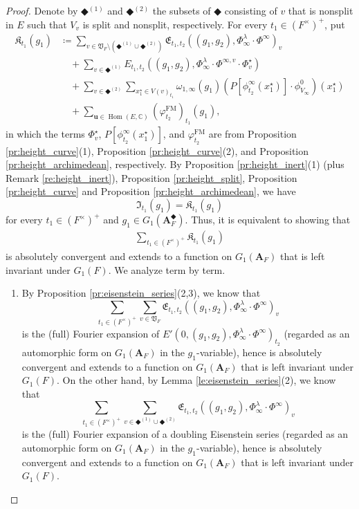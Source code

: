 \documentclass[12pt]{amsart}
\numberwithin{equation}{section}
\theoremstyle{plain}
\theoremstyle{definition}
\theoremstyle{remark}
\renewcommand{\b}[1]{\mathbf{#1}}
\renewcommand{\d}[1]{\mathbb{#1}}
\newcommand{\f}[1]{\mathfrak{#1}}
\renewcommand{\r}[1]{\mathrm{#1}}
\renewcommand{\(}{\left(}
\renewcommand{\)}{\right)}
\newcommand{\bA}{\b A}
\newcommand{\dC}{\d C}
\newcommand{\fE}{\f E}
\newcommand{\fI}{\f I}
\newcommand{\fK}{\f K}
\newcommand{\fV}{\f V}
\newcommand{\bbu}{\boldsymbol{u}}
\newcommand{\KM}{\r{FM}}
\DeclareMathOperator{\Hom}{Hom}
\begin{document}
\begin{proof}
Denote by $\Diamondblack^{(1)}$ and $\Diamondblack^{(2)}$ the subsets of $\Diamondblack$ consisting of $v$ that is nonsplit in $E$ such that $V_v$ is split and nonsplit, respectively. For every $t_1\in(F^\times)^+$, put
\begin{align*}
\fK_{t_1}(g_1)&\coloneqq \sum_{v\in\fV_F\setminus(\Diamondblack^{(1)}\cup\Diamondblack^{(2)})}
\fE_{t_1,t_2}((g_1,g_2),\Phi^\lambda_\infty\cdot\Phi^\infty)_v \\
&\quad +\sum_{v\in\Diamondblack^{(1)}}E_{t_1,t_2}((g_1,g_2),\Phi^\lambda_\infty\cdot\Phi^{\infty,v}\cdot\Phi^\star_v) \\
&\quad +\sum_{v\in\Diamondblack^{(2)}}\sum_{x^\star_1\in V(v)_{t_1}}\omega_{1,\infty}(g_1)\(P[\phi^\infty_{t_2}(x^\star_1)]\cdot\phi^0_{V_\infty}\)(x^\star_1) \\
&\quad +\sum_{\bbu\in\Hom(E,\dC)}(\varphi^\KM_{t_2})_{t_1}(g_1),
\end{align*}
in which the terms $\Phi^\star_{v}$, $P[\phi^\infty_{t_2}(x^\star_1)]$, and $\varphi^\KM_{t_2}$ are from Proposition \ref{pr:height_curve}(1), Proposition \ref{pr:height_curve}(2), and Proposition \ref{pr:height_archimedean}, respectively. By Proposition \ref{pr:height_inert}(1) (plus Remark \ref{re:height_inert}), Proposition \ref{pr:height_split}, Proposition \ref{pr:height_curve} and Proposition \ref{pr:height_archimedean}, we have
\[
\fI_{t_1}(g_1)=\fK_{t_1}(g_1)
\]
for every $t_1\in(F^\times)^+$ and $g_1\in G_1(\bA_F^\Diamondblack)$. Thus, it is equivalent to showing that
\begin{align}\label{eq:modularity_3}
\sum_{t_1\in(F^\times)^+}\fK_{t_1}(g_1)
\end{align}
is absolutely convergent and extends to a function on $G_1(\bA_F)$ that is left invariant under $G_1(F)$. We analyze term by term.
\begin{enumerate}
  \item By Proposition \ref{pr:eisenstein_series}(2,3), we know that
      \[
      \sum_{t_1\in(F^\times)^+}\sum_{v\in\fV_F}\fE_{t_1,t_2}((g_1,g_2),\Phi^\lambda_\infty\cdot\Phi^\infty)_v
      \]
      is the (full) Fourier expansion of $E'(0,(g_1,g_2),\Phi^\lambda_\infty\cdot\Phi^\infty)_{t_2}$ (regarded as an automorphic form on $G_1(\bA_F)$ in the $g_1$-variable), hence is absolutely convergent and extends to a function on $G_1(\bA_F)$ that is left invariant under $G_1(F)$. On the other hand, by Lemma \ref{le:eisenstein_series}(2), we know that
      \[
      \sum_{t_1\in(F^\times)^+}\sum_{v\in\Diamondblack^{(1)}\cup\Diamondblack^{(2)}}
      \fE_{t_1,t_2}((g_1,g_2),\Phi^\lambda_\infty\cdot\Phi^\infty)_v
      \]
      is the (full) Fourier expansion of a doubling Eisenstein series (regarded as an automorphic form on $G_1(\bA_F)$ in the $g_1$-variable), hence is absolutely convergent and extends to a function on $G_1(\bA_F)$ that is left invariant under $G_1(F)$.


\end{enumerate}
\end{proof}
\end{document}
